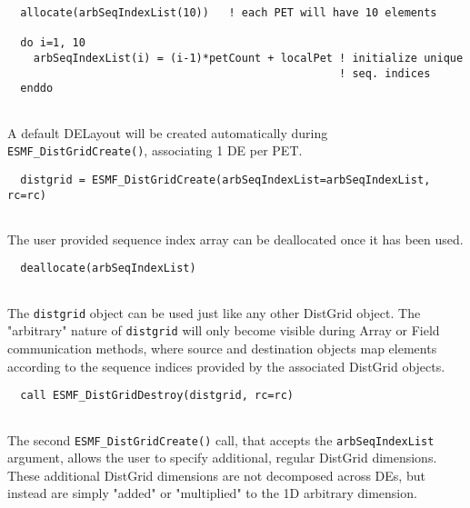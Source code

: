 
 \begin{verbatim}
  allocate(arbSeqIndexList(10))   ! each PET will have 10 elements
  
  do i=1, 10
    arbSeqIndexList(i) = (i-1)*petCount + localPet ! initialize unique 
                                                   ! seq. indices
  enddo
 
\end{verbatim}
 

   A default DELayout will be created automatically during 
   {\tt ESMF\_DistGridCreate()}, associating 1 DE per PET. 

 \begin{verbatim}
  distgrid = ESMF_DistGridCreate(arbSeqIndexList=arbSeqIndexList, rc=rc)
 
\end{verbatim}
 

   The user provided sequence index array can be deallocated once it has
   been used. 

 \begin{verbatim}
  deallocate(arbSeqIndexList)
 
\end{verbatim}
 

   The {\tt distgrid} object can be used just like any other DistGrid object.
   The "arbitrary" nature of {\tt distgrid} will only become visible during
   Array or Field communication methods, where source and destination objects
   map elements according to the sequence indices provided by the associated
   DistGrid objects. 

 \begin{verbatim}
  call ESMF_DistGridDestroy(distgrid, rc=rc)
 
\end{verbatim}
 

   The second {\tt ESMF\_DistGridCreate()} call, that accepts the 
   {\tt arbSeqIndexList} argument, allows the user to specify additional,
   regular DistGrid dimensions. These additional DistGrid dimensions are not
   decomposed across DEs, but instead are simply "added" or "multiplied" to the
   1D arbitrary dimension.
  
